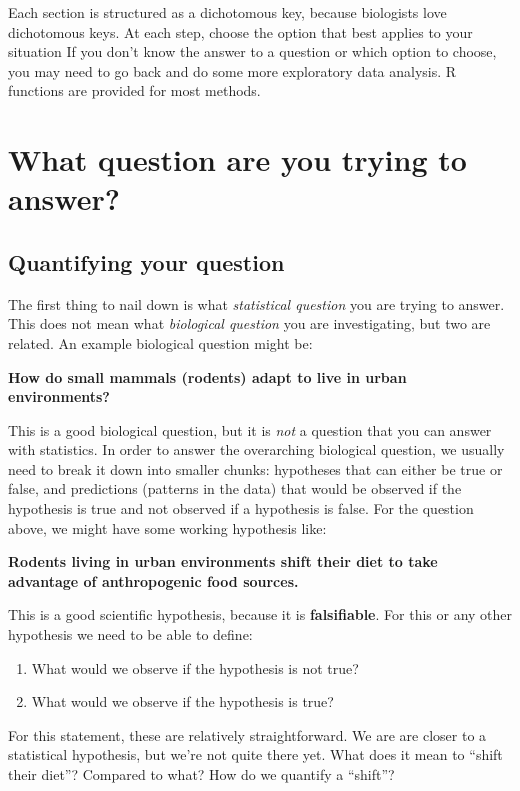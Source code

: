 \documentclass[
  13,
  letterpaper,
]{report}
\providecommand{\tightlist}{%
  \setlength{\itemsep}{0pt}\setlength{\parskip}{0pt}}
\begin{document}
Each section is structured as a dichotomous key, because biologists love
dichotomous keys. At each step, choose the option that best applies to
your situation If you don't know the answer to a question or which
option to choose, you may need to go back and do some more exploratory
data analysis. R functions are provided for most methods.

\section{What question are you trying to
answer?}\label{sec-plan-question}

\subsection{Quantifying your question}\label{sec-plan-question-quant}

The first thing to nail down is what \emph{statistical question} you are
trying to answer. This does not mean what \emph{biological question} you
are investigating, but two are related. An example biological question
might be:

\textbf{How do small mammals (rodents) adapt to live in urban
environments?}

This is a good biological question, but it is \emph{not} a question that
you can answer with statistics. In order to answer the overarching
biological question, we usually need to break it down into smaller
chunks: hypotheses that can either be true or false, and predictions
(patterns in the data) that would be observed if the hypothesis is true
and not observed if a hypothesis is false. For the question above, we
might have some working hypothesis like:

\textbf{Rodents living in urban environments shift their diet to take
advantage of anthropogenic food sources.}

This is a good scientific hypothesis, because it is
\textbf{falsifiable}. For this or any other hypothesis we need to be
able to define:

\begin{enumerate}
\def\labelenumi{\arabic{enumi}.}
\tightlist
\item
  What would we observe if the hypothesis is not true?
\item
  What would we observe if the hypothesis is true?
\end{enumerate}

For this statement, these are relatively straightforward. We are are
closer to a statistical hypothesis, but we're not quite there yet. What
does it mean to ``shift their diet''? Compared to what? How do we
quantify a ``shift''?
\end{document}
